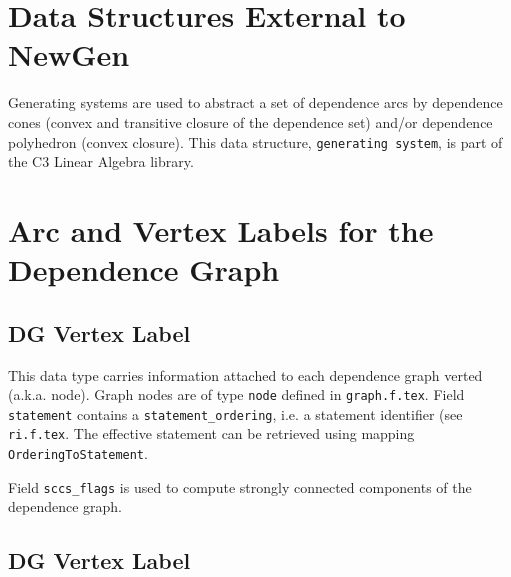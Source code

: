 \documentclass[a4paper]{article}
\begin{document}
{}

\section{Data Structures External to NewGen}
\label{section-data-structures-external-to-newgen}

Generating systems are used to abstract a set of dependence arcs by
dependence cones (convex and transitive closure of the dependence set)
and/or dependence polyhedron (convex closure). This data structure,
\verb/generating system/, is
part of the C3 Linear Algebra library.


\section{Arc and Vertex Labels for the Dependence Graph}
\label{section-arc-and-vertex-lables-for-the-dependence-graph}

\subsection{DG Vertex Label}

{}

This data type carries information attached to each dependence graph
verted (a.k.a. node). Graph nodes are of type \verb/node/ defined in
{\tt graph.f.tex}.  Field \verb/statement/ contains a
\verb/statement_ordering/, i.e. a statement identifier (see {\tt
ri.f.tex}. The effective statement can be retrieved using mapping
\verb/OrderingToStatement/.

Field \verb/sccs_flags/ is used to compute strongly connected components
of the dependence graph.

\begin{comment}
Ce domaine est utilise' pour contenir les informations qui sont
attache'es a` chaque noeud du graphe de de'pendances (voir le domaine
{\tt graph} dans le fichier {\tt graph.f.tex}). Le sous-domaine {\tt
statement} permet de retrouver l'instruction qui porte la de'pendance;
cet entier est le champ {\tt ordering} de l'instruction concerne'e. Le
sous-domaine {\tt sccflags} contient diverses informations utiles pour
le calcul des composantes fortement connexes.
\end{comment}

\subsection{DG Vertex Label}
\end{document}
